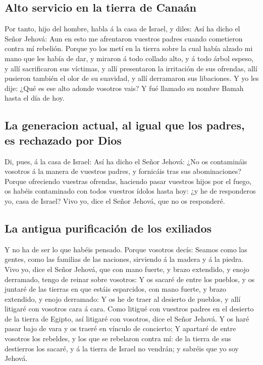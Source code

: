 \hypertarget{alto-servicio-en-la-tierra-de-canauxe1n}{%
\subsection{Alto servicio en la tierra de
Canaán}\label{alto-servicio-en-la-tierra-de-canauxe1n}}

 Por tanto, hijo del hombre, habla á la casa de Israel, y
diles: Así ha dicho el Señor Jehová: Aun en esto me afrentaron vuestros
padres cuando cometieron contra mí rebelión.  Porque yo los
metí en la tierra sobre la cual había alzado mi mano que les había de
dar, y miraron á todo collado alto, y á todo árbol espeso, y allí
sacrificaron sus víctimas, y allí presentaron la irritación de sus
ofrendas, allí pusieron también el olor de su suavidad, y allí
derramaron sus libaciones.  Y yo les dije: ¿Qué es ese alto
adonde vosotros vais? Y fué llamado su nombre Bamah hasta el día de hoy.

\hypertarget{la-generacion-actual-al-igual-que-los-padres-es-rechazado-por-dios}{%
\subsection{La generacion actual, al igual que los padres, es rechazado
por
Dios}\label{la-generacion-actual-al-igual-que-los-padres-es-rechazado-por-dios}}

 Di, pues, á la casa de Israel: Así ha dicho el Señor
Jehová: ¿No os contamináis vosotros á la manera de vuestros padres, y
fornicáis tras sus abominaciones?  Porque ofreciendo
vuestras ofrendas, haciendo pasar vuestros hijos por el fuego, os habéis
contaminado con todos vuestros ídolos hasta hoy: ¿y he de responderos
yo, casa de Israel? Vivo yo, dice el Señor Jehová, que no os responderé.

\hypertarget{la-antigua-purificaciuxf3n-de-los-exiliados}{%
\subsection{La antigua purificación de los
exiliados}\label{la-antigua-purificaciuxf3n-de-los-exiliados}}

 Y no ha de ser lo que habéis pensado. Porque vosotros
decís: Seamos como las gentes, como las familias de las naciones,
sirviendo á la madera y á la piedra.  Vivo yo, dice el
Señor Jehová, que con mano fuerte, y brazo extendido, y enojo derramado,
tengo de reinar sobre vosotros:  Y os sacaré de entre los
pueblos, y os juntaré de las tierras en que estáis esparcidos, con mano
fuerte, y brazo extendido, y enojo derramado:  Y os he de
traer al desierto de pueblos, y allí litigaré con vosotros cara á cara.
 Como litigué con vuestros padres en el desierto de la
tierra de Egipto, así litigaré con vosotros, dice el Señor Jehová.
 Y os haré pasar bajo de vara y os traeré en vínculo de
concierto;  Y apartaré de entre vosotros los rebeldes, y
los que se rebelaron contra mí: de la tierra de sus destierros los
sacaré, y á la tierra de Israel no vendrán; y sabréis que yo soy Jehová.

